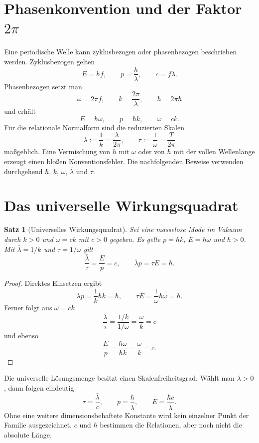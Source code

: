\documentclass[11pt,a4paper]{article}
\newtheorem{satz}{Satz}
\begin{document}
\section{Phasenkonvention und der Faktor $2\pi$}

Eine periodische Welle kann zyklusbezogen oder phasenbezogen beschrieben
werden. Zyklusbezogen gelten
\[
 E=hf,\qquad p=\frac{h}{\lambda},\qquad c=f\lambda.
\]
Phasenbezogen setzt man
\[
 \omega=2\pi f,\qquad k=\frac{2\pi}{\lambda},\qquad h=2\pi\hbar
\]
und erhält
\[
 E=\hbar\omega,\qquad p=\hbar k,\qquad \omega=ck.
\]
Für die relationale Normalform sind die reduzierten Skalen
\begin{equation}
 \bar\lambda:=\frac{1}{k}=\frac{\lambda}{2\pi},
 \qquad
 \tau:=\frac{1}{\omega}=\frac{T}{2\pi}
 \label{eq:reduced}
\end{equation}
maßgeblich. Eine Vermischung von $h$ mit $\omega$ oder von $\hbar$ mit der
vollen Wellenlänge erzeugt einen bloßen Konventionsfehler. Die nachfolgenden
Beweise verwenden durchgehend $\hbar$, $k$, $\omega$, $\bar\lambda$ und
$\tau$.

\section{Das universelle Wirkungsquadrat}

\begin{satz}[Universelles Wirkungsquadrat]
Sei eine masselose Mode im Vakuum durch $k>0$ und $\omega=ck$ mit $c>0$
gegeben. Es gelte $p=\hbar k$, $E=\hbar\omega$ und $\hbar>0$. Mit
$\bar\lambda=1/k$ und $\tau=1/\omega$ gilt
\begin{equation}
 \frac{\bar\lambda}{\tau}=\frac{E}{p}=c,
 \qquad
 \bar\lambda p=\tau E=\hbar.
 \label{eq:universal}
\end{equation}
\end{satz}

\begin{proof}
Direktes Einsetzen ergibt
\[
 \bar\lambda p=\frac{1}{k}\hbar k=\hbar,
 \qquad
 \tau E=\frac{1}{\omega}\hbar\omega=\hbar.
\]
Ferner folgt aus $\omega=ck$
\[
 \frac{\bar\lambda}{\tau}
 =\frac{1/k}{1/\omega}=\frac{\omega}{k}=c
\]
und ebenso
\[
 \frac{E}{p}=\frac{\hbar\omega}{\hbar k}=\frac{\omega}{k}=c.
\]
\end{proof}

Die universelle Lösungsmenge besitzt einen Skalenfreiheitsgrad. Wählt man
$\bar\lambda>0$, dann folgen eindeutig
\begin{equation}
 \tau=\frac{\bar\lambda}{c},\qquad
 p=\frac{\hbar}{\bar\lambda},\qquad
 E=\frac{\hbar c}{\bar\lambda}.
 \label{eq:family}
\end{equation}
Ohne eine weitere dimensionsbehaftete Konstante wird kein einzelner Punkt der
Familie ausgezeichnet. $c$ und $\hbar$ bestimmen die Relationen, aber noch
nicht die absolute Länge.
\end{document}
